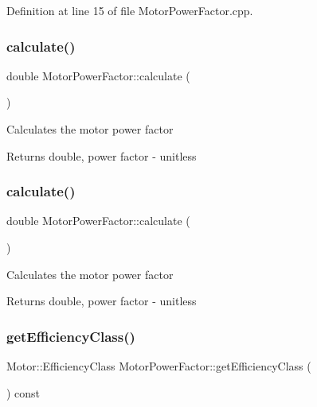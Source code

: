 Definition at line 15 of file Motor\+Power\+Factor.\+cpp.

\mbox{\label{class_motor_power_factor_ac9d5742db4a371bc4e15d5b29d335b6e}} 
\subsubsection{\texorpdfstring{calculate()}{calculate()}\hspace{0.1cm}{\footnotesize\ttfamily [2/3]}}
{\footnotesize\ttfamily double Motor\+Power\+Factor\+::calculate (\begin{DoxyParamCaption}{ }\end{DoxyParamCaption})}

Calculates the motor power factor \begin{DoxyReturn}{Returns}
double, power factor -\/ unitless 
\end{DoxyReturn}
\mbox{\label{class_motor_power_factor_ac9d5742db4a371bc4e15d5b29d335b6e}} 
\subsubsection{\texorpdfstring{calculate()}{calculate()}\hspace{0.1cm}{\footnotesize\ttfamily [3/3]}}
{\footnotesize\ttfamily double Motor\+Power\+Factor\+::calculate (\begin{DoxyParamCaption}{ }\end{DoxyParamCaption})}

Calculates the motor power factor \begin{DoxyReturn}{Returns}
double, power factor -\/ unitless 
\end{DoxyReturn}
\mbox{\label{class_motor_power_factor_a1ce98cb6ae9fbf09b05b4b6bd75e5c71}} 
\subsubsection{\texorpdfstring{get\+Efficiency\+Class()}{getEfficiencyClass()}\hspace{0.1cm}{\footnotesize\ttfamily [1/3]}}
{\footnotesize\ttfamily Motor\+::\+Efficiency\+Class Motor\+Power\+Factor\+::get\+Efficiency\+Class (\begin{DoxyParamCaption}{ }\end{DoxyParamCaption}) const\hspace{0.3cm}{\ttfamily [inline]}}

